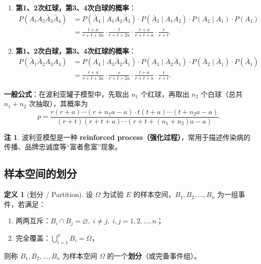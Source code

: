 \documentclass[11pt,a4paper]{report}
\theoremstyle{definition}
\newtheorem{definition}{定义}[chapter]
\newtheorem{note}{注}[chapter]
\begin{document}
\begin{enumerate}[label=(\arabic*),leftmargin=2em]
    \item \textbf{第1、2次红球，第3、4次白球的概率}：
    \begin{align*}
    P(A_1 A_2 \bar{A}_3 \bar{A}_4) 
    &= P(\bar{A}_4 \mid A_1 A_2 \bar{A}_3) \cdot P(\bar{A}_3 \mid A_1 A_2) \cdot P(A_2 \mid A_1) \cdot P(A_1) \\
    &= \frac{t+a}{r+t+3a} \cdot \frac{t}{r+t+2a} \cdot \frac{r+a}{r+t+a} \cdot \frac{r}{r+t}.
    \end{align*}
    
    \item \textbf{第1、2次白球，第3、4次红球的概率}：
    \begin{align*}
    P(\bar{A}_1 \bar{A}_2 A_3 A_4) 
    &= P(A_4 \mid A_3 \bar{A}_2 \bar{A}_1) \cdot P(A_3 \mid \bar{A}_2 \bar{A}_1) \cdot P(\bar{A}_2 \mid \bar{A}_1) \cdot P(\bar{A}_1) \\
    &= \frac{r+a}{r+t+3a} \cdot \frac{r}{r+t+2a} \cdot \frac{t+a}{r+t+a} \cdot \frac{t}{r+t}.
    \end{align*}
\end{enumerate}

\textbf{一般公式}：在波利亚罐子模型中，先取出 $n_1$ 个红球，再取出 $n_2$ 个白球（总共 $n_1+n_2$ 次抽取），其概率为
\[
\boxed{p = \frac{r(r+a)\cdots(r+n_1 a - a) \cdot t(t+a)\cdots(t+n_2 a - a)}{(r+t)(r+t+a)\cdots(r+t+(n_1+n_2)a - a)}}.
\]

\begin{note}
波利亚模型是一种\textbf{ reinforced process（强化过程）}，常用于描述传染病的传播、品牌忠诚度等``富者愈富''现象。
\end{note}

\subsection{样本空间的划分}

\begin{definition}[划分 / Partition]
设 $\Omega$ 为试验 $E$ 的样本空间，$B_1, B_2, \dots, B_n$ 为一组事件，若满足：
\begin{enumerate}[label=(\arabic*),leftmargin=2em]
    \item 两两互斥：$B_i \cap B_j = \varnothing,\; i \neq j,\; i,j = 1,2,\dots,n$；
    \item 完全覆盖：$\displaystyle\bigcup_{i=1}^{n} B_i = \Omega$，
\end{enumerate}
则称 $B_1, B_2, \dots, B_n$ 为样本空间 $\Omega$ 的一个\textbf{划分}（或完备事件组）。
\end{definition}
\end{document}
